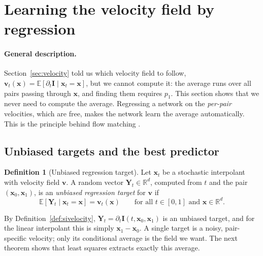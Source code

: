 \documentclass[11pt,a4paper]{article}
\numberwithin{equation}{section}     %
\theoremstyle{plain}        %
\theoremstyle{definition}   %
\newtheorem{definition}[theorem]{Definition}
\theoremstyle{remark}       %
\begin{document}
\newpage

\section{Learning the velocity field by regression}\label{sec:regression}

\paragraph{General description.} Section~\ref{sec:velocity} told us which velocity field to follow, $\mathbf{v}_t(\mathbf{x})=\mathbb{E}[\partial_t\mathbf{I}\mid\mathbf{x}_t=\mathbf{x}]$, but we cannot compute it: the average runs over all pairs passing through $\mathbf{x}$, and finding them requires $p_1$. This section shows that we never need to compute the average. Regressing a network on the \emph{per-pair} velocities, which are free, makes the network learn the average automatically. This is the principle behind flow matching \citep{lipman2023,liu2023,albergo2023building}.

\subsection{Unbiased targets and the best predictor}

\begin{definition}[Unbiased regression target]\label{def:unbiased}
Let $\mathbf{x}_t$ be a stochastic interpolant with velocity field $\mathbf{v}$. A random vector $\mathbf{Y}_t\in\mathbb{R}^d$, computed from $t$ and the pair $(\mathbf{x}_0,\mathbf{x}_1)$, is an \emph{unbiased regression target} for $\mathbf{v}$ if
\[
\mathbb{E}\left[\mathbf{Y}_t\mid\mathbf{x}_t=\mathbf{x}\right]=\mathbf{v}_t(\mathbf{x})\qquad\text{for all }t\in[0,1]\text{ and }\mathbf{x}\in\mathbb{R}^d .
\]
\end{definition}

By Definition~\ref{def:sivelocity}, $\mathbf{Y}_t=\partial_t\mathbf{I}(t,\mathbf{x}_0,\mathbf{x}_1)$ is an unbiased target, and for the linear interpolant this is simply $\mathbf{x}_1-\mathbf{x}_0$. A single target is a noisy, pair-specific velocity; only its conditional average is the field we want. The next theorem shows that least squares extracts exactly this average.
\end{document}
